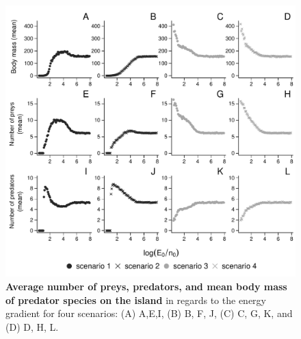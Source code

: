 \begin{figure}[htbp]
\centering
\includegraphics{fig/fig4.pdf}
\caption{\textbf{Average number of preys, predators, and mean body mass
of predator species on the island} in regards to the energy gradient for
four scenarios: (A) A,E,I, (B) B, F, J, (C) C, G, K, and (D) D, H,
L.\label{fig:etib4}}
\end{figure}
